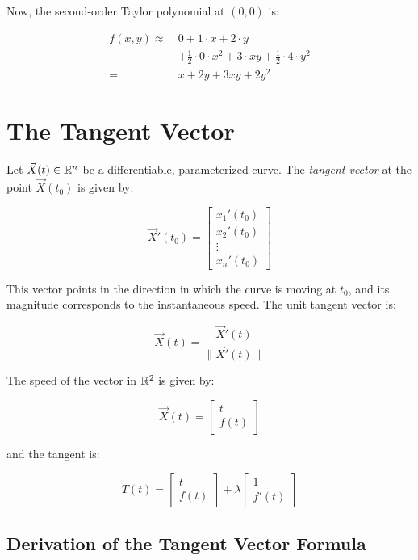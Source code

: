 Now, the second-order Taylor polynomial at \( (0, 0) \) is:

\begin{align*}
    f(x, y) \approx\ & 0 + 1 \cdot x + 2 \cdot y \\
    &+ \frac{1}{2} \cdot 0 \cdot x^2 + 3 \cdot x y + \frac{1}{2} \cdot 4 \cdot y^2 \\
    =\, & x + 2y + 3xy + 2y^2
\end{align*}

\section{The Tangent Vector}

Let \( \vec{X}(t) \in \mathbb{R}^n \) be a differentiable, parameterized curve. The \emph{tangent vector} 
at the point \( \vec{X}(t_0) \) is given by:

\[
    \vec{X}'(t_0) = \begin{bmatrix}
        x_1 ' (t_0) \\ x_2 ' (t_0) \\ \vdots \\ x_n ' (t_0)
    \end{bmatrix}
\]

This vector points in the direction in which the curve is moving at \( t_0 \), and its magnitude 
corresponds to the instantaneous speed. The unit tangent vector is:

\[
    \vec{X}(t) = \frac{\vec{X}'(t)}{\|\vec{X}'(t)\|}
\]

The speed of the vector in \(\mathbb{R}^2\) is given by:

\[
    \vec{X}(t) = \begin{bmatrix}
        t \\ f(t)
    \end{bmatrix}
\]

and the tangent is:

\[
    T(t) = \begin{bmatrix}
        t \\ f(t)
    \end{bmatrix} + \lambda \begin{bmatrix}
        1 \\ f'(t)
    \end{bmatrix}
\]

\subsection{Derivation of the Tangent Vector Formula}

